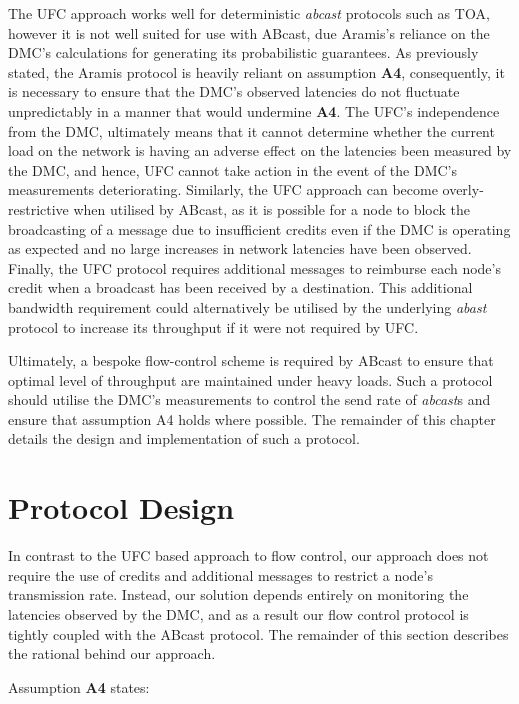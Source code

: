 The \textsf{UFC} approach works well for deterministic \emph{abcast} protocols such as TOA, however it is not well suited for use with \textsf{ABcast}, due \textsf{Aramis}'s reliance on the DMC's calculations for generating its probabilistic guarantees.  As previously stated, the \textsf{Aramis} protocol is heavily reliant on assumption \textbf{A4}, consequently, it is necessary to ensure that the DMC's observed latencies do not fluctuate unpredictably in a manner that would undermine \textbf{A4}.  The \textsf{UFC}'s independence from the DMC, ultimately means that it cannot determine whether the current load on the network is having an adverse effect on the latencies been measured by the DMC, and hence, \textsf{UFC} cannot take action in the event of the DMC's measurements deteriorating.  Similarly, the \textsf{UFC} approach can become overly-restrictive when utilised by \textsf{ABcast}, as it is possible for a node to block the broadcasting of a message due to insufficient credits even if the DMC is operating as expected and no large increases in network latencies have been observed.  Finally, the \textsf{UFC} protocol requires additional messages to reimburse each node's credit when a broadcast has been received by a destination.  This additional bandwidth requirement could alternatively be utilised by the underlying \emph{abast} protocol to increase its throughput if it were not required by \textsf{UFC}.  

Ultimately, a bespoke flow-control scheme is required by \textsf{ABcast} to ensure that optimal level of throughput are maintained under heavy loads.  Such a protocol should utilise the DMC's measurements to control the send rate of \emph{abcast}s and ensure that assumption A4 holds where possible.  The remainder of this chapter details the design and implementation of such a protocol.  

\section{Protocol Design}
    In contrast to the \textsf{UFC} based approach to flow control, our approach does not require the use of credits and additional messages to restrict a node's transmission rate.  Instead, our solution depends entirely on monitoring the latencies observed by the DMC, and as a result our flow control protocol is tightly coupled with the \textsf{ABcast} protocol.  The remainder of this section describes the rational behind our approach.  
    
    Assumption \textbf{A4} states:
    
